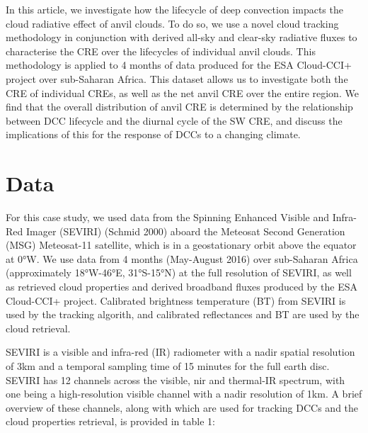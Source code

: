 In this article, we investigate how the lifecycle of deep convection
impacts the cloud radiative effect of anvil clouds. To do so, we use a
novel cloud tracking methodology in conjunction with derived all-sky and
clear-sky radiative fluxes to characterise the CRE over the lifecycles
of individual anvil clouds. This methodology is applied to 4 months of
data produced for the ESA Cloud-CCI+ project over sub-Saharan Africa.
This dataset allows us to investigate both the CRE of individual CREs,
as well as the net anvil CRE over the entire region. We find that the
overall distribution of anvil CRE is determined by the relationship
between DCC lifecycle and the diurnal cycle of the SW CRE, and discuss
the implications of this for the response of DCCs to a changing climate.

\section{Data}

For this case study, we used data from the Spinning Enhanced Visible and
Infra-Red Imager (SEVIRI) (Schmid 2000) aboard the Meteosat Second
Generation (MSG) Meteosat-11 satellite, which is in a geostationary
orbit above the equator at 0°W. We use data from 4 months (May-August
2016) over sub-Saharan Africa (approximately 18°W-46°E, 31°S-15°N) at
the full resolution of SEVIRI, as well as retrieved cloud properties and
derived broadband fluxes produced by the ESA Cloud-CCI+ project.
Calibrated brightness temperature (BT) from SEVIRI is used by the
tracking algorith, and calibrated reflectances and BT are used by the
cloud retrieval.

SEVIRI is a visible and infra-red (IR) radiometer with a nadir spatial
resolution of 3km and a temporal sampling time of 15 minutes for the
full earth disc. SEVIRI has 12 channels across the visible, \acrshort{nir} and
thermal-IR spectrum, with one being a high-resolution visible channel
with a nadir resolution of 1km. A brief overview of these channels,
along with which are used for tracking DCCs and the cloud properties
retrieval, is provided in table 1:

